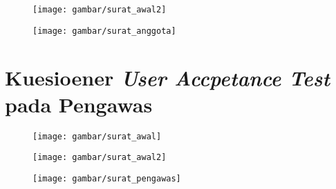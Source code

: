 \begin{figure}[H]
	\centering
	\texttt{[image: gambar/surat\_awal2]}	
\end{figure}

\begin{figure}[H]
	\centering
	\texttt{[image: gambar/surat\_anggota]}	
\end{figure}

\chapter{Kuesioener \textit{User Accpetance Test} pada Pengawas}
\begin{figure}[H]
	\centering
	\texttt{[image: gambar/surat\_awal]}	
\end{figure}

\begin{figure}[H]
	\centering
	\texttt{[image: gambar/surat\_awal2]}	
\end{figure}

\begin{figure}[H]
	\centering
	\texttt{[image: gambar/surat\_pengawas]}	
\end{figure}


